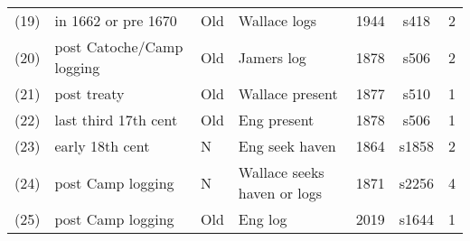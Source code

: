 \begin{table}
\begin{sideways}
\begin{tabular}{cp{.35\textheight}lp{.2\textheight}ccc}
(19)	&in 1662	or pre 1670&Old	&Wallace logs	&1944	&s418	&2\\ %
(20)	&post Catoche/Camp logging	&Old	&Jamers log	&1878	&s506	&2\\ %
(21)	&post treaty	&Old	&Wallace present	&1877	&s510	&1\\ %
(22)	&last third 17th cent	&Old	&Eng present	&1878	&s506	&1\\ %
(23)	&early 18th cent	&N	&Eng seek haven	&1864	&s1858	&2\\ %
(24)	&post Camp logging	&N	&Wallace seeks haven or logs	&1871	&s2256	&4\\ %
(25)	&post Camp logging	&Old	&Eng log	&2019	&s1644	&1 %
\end{tabular}
\end{sideways}
\end{table}
%
